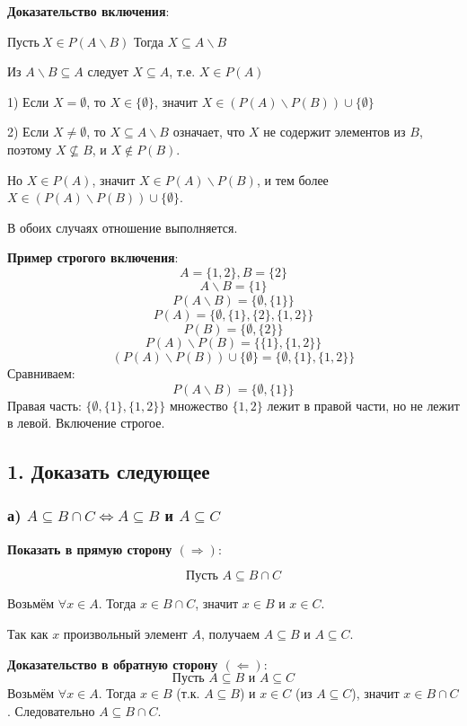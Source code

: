 \documentclass[12pt]{article}
\begin{document}
\textbf{Доказательство включения}:

\(\textbf{Пусть}\ X \in P(A \backslash B)\) Тогда \( X \subseteq A \backslash B \)

Из \( A \backslash B \subseteq A \) следует \( X \subseteq A \), т.е. \( X \in P(A) \)

1) Если \( X = \emptyset \), то \( X \in \{\emptyset\} \), значит \( X \in (P(A) \backslash P(B)) \cup \{\emptyset\} \) 

2) Если \( X \neq \emptyset \), то \( X \subseteq A \backslash B \) означает, что \( X \) не содержит элементов из \( B \), поэтому \( X \not\subseteq B \), и \( X \notin P(B) \).

Но \( X \in P(A) \), значит \( X \in P(A) \backslash P(B) \), и тем более \( X \in (P(A) \backslash P(B)) \cup \{\emptyset\} \).

В обоих случаях отношение выполняется.

\textbf{Пример строгого включения}:
\[
A = \{1,2\}, B = \{2\}
\]
\[
A \backslash B = \{1\}
\]
\[
P(A \backslash B) = \{ \emptyset, \{1\} \}
\]
\[
P(A) = \{ \emptyset, \{1\}, \{2\}, \{1,2\} \}
\]
\[
P(B) = \{ \emptyset, \{2\} \}
\]
\[
P(A) \backslash P(B) = \{ \{1\}, \{1,2\} \}
\]
\[
(P(A) \backslash P(B)) \cup \{ \emptyset \} = \{ \emptyset, \{1\}, \{1,2\} \}
\]
Сравниваем:
\[
P(A \backslash B) = \{ \emptyset, \{1\} \}
\]
Правая часть: \(\{ \emptyset, \{1\}, \{1,2\} \}\) множество  \(\{1,2\}\) лежит в правой части, но не лежит в левой. Включение строгое.

\subsection*{1. Доказать следующее}

\subsubsection*{а) \( A \subseteq B \cap C \iff A \subseteq B \) и \( A \subseteq C \)}

\textbf{Показать в прямую сторону \( (\Rightarrow) \)}:

\[
\text{Пусть } A \subseteq B \cap C
\]

Возьмём \( \forall x \in A \). Тогда \( x \in B \cap C \), значит \( x \in B \) и \( x \in C \).

Так как \( x \) произвольный элемент \( A \), получаем \( A \subseteq B \) и \( A \subseteq C \).

\textbf{Доказательство в обратную сторону \( (\Leftarrow) \)}:
\[
\text{Пусть } A \subseteq B \text{ и } A \subseteq C
\]
Возьмём \( \forall x \in A \). Тогда \( x \in B \) (т.к. \( A \subseteq B \)) и \( x \in C \) (из \( A \subseteq C \)), значит \( x \in B \cap C \).
Следовательно \( A \subseteq B \cap C \).
\end{document}

